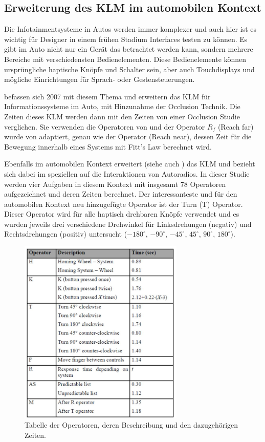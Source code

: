 \subsection[KLM im automobilen Kontext]{Erweiterung des KLM im automobilen Kontext}
Die Infotainmentsysteme in Autos werden immer komplexer und auch hier ist es wichtig für Designer in einem frühen Stadium Interfaces testen zu können. 
Es gibt im Auto nicht nur ein Gerät das betrachtet werden kann, sondern mehrere Bereiche mit verschiedensten Bedienelementen. 
Diese Bedienelemente können ursprüngliche haptische Knöpfe und Schalter sein, aber auch Touchdisplays und mögliche Einrichtungen für Sprach- oder Gestensteuerungen. 

\citet{Pettitt_2007} befassen sich 2007 mit diesem Thema und erweitern das KLM für Informationssysteme im Auto, mit Hinzunahme der Occlusion Technik. 
Die Zeiten dieses KLM werden dann mit den Zeiten von einer Occlusion Studie verglichen. 
Sie verwenden die Operatoren von \citet{Card_1980} und der Operator $R_f$ (Reach far) wurde von \citet{Green_2002} adaptiert, genau wie der Operator (Reach near), dessen Zeit für die Bewegung innerhalb eines Systems mit Fitt's Law berechnet wird.

Ebenfalls im automobilen Kontext erweitert \citet{schneegass_2009} (siehe auch \citep{SchneegaB_2011}) das KLM und bezieht sich dabei im speziellen auf die Interaktionen von Autoradios. 
In dieser Studie werden vier Aufgaben in diesem Kontext mit insgesamt 78 Operatoren aufgezeichnet und deren Zeiten berechnet. 
Der interessanteste und für den automobilen Kontext neu hinzugefügte Operator ist der Turn (T) Operator. 
Dieser Operator wird für alle haptisch drehbaren Knöpfe verwendet und es wurden jeweils drei verschiedene Drehwinkel für Linksdrehungen (negativ) und Rechtsdrehungen (positiv) untersucht ($-180^\circ$, $-90^\circ$, $-45^\circ$, $45^\circ$, $90^\circ$, $180^\circ$). 
\begin{figure}[ht]
  \centering
  \includegraphics[width=0.7\textwidth]{img/Schneegass_KLM_Operator_Table.jpg}
  \caption[Tabelle der Operatorzeiten von Schneegaß]{Tabelle der Operatoren, deren Beschreibung und den dazugehörigen Zeiten.}
  \label{fig:Bild1}
\end{figure}

